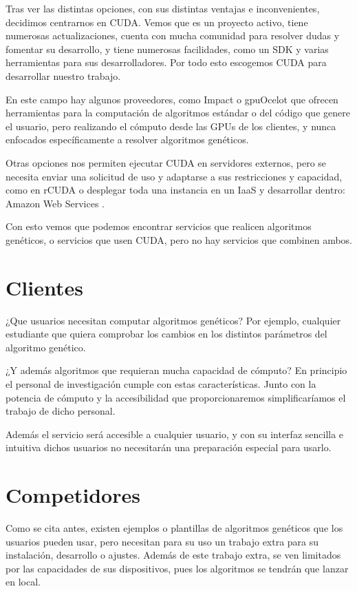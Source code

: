 Tras ver las distintas opciones, con sus distintas ventajas e inconvenientes, decidimos centrarnos en CUDA. Vemos que es un proyecto activo, tiene numerosas actualizaciones, cuenta con mucha comunidad para resolver dudas y fomentar su desarrollo, y tiene numerosas facilidades, como un SDK \cite{nvidiadeveloper} y varias herramientas para sus desarrolladores. Por todo esto escogemos CUDA para desarrollar nuestro trabajo.

En este campo hay algunos proveedores, como Impact  \cite{cudaimpact} o gpuOcelot \cite{cudagpuocelot} que ofrecen herramientas para la computación de algoritmos estándar o del código que genere el usuario, pero  realizando el cómputo desde las GPUs de los clientes, y nunca enfocados específicamente a resolver algoritmos genéticos.

Otras opciones nos permiten ejecutar CUDA en servidores externos, pero se necesita enviar una solicitud de uso y adaptarse a sus restricciones y capacidad, como en rCUDA \cite{rcuda}
o desplegar toda una instancia en un IaaS y desarrollar dentro: Amazon Web Services \cite{amazoncuda}.


Con esto vemos que podemos encontrar servicios que realicen algoritmos genéticos, o servicios que usen CUDA, pero no hay servicios que combinen ambos.


\bigskip
\section{Clientes}
\bigskip

¿Que usuarios necesitan computar algoritmos genéticos?
Por ejemplo, cualquier estudiante que quiera comprobar los cambios en los distintos parámetros del algoritmo genético.

¿Y además algoritmos que requieran mucha capacidad de cómputo? En principio el personal de investigación cumple con estas características. Junto con la potencia de cómputo y la accesibilidad que proporcionaremos simplificaríamos el trabajo de dicho personal. 

Además el servicio será accesible a cualquier usuario, y con su interfaz sencilla e intuitiva dichos usuarios no necesitarán una preparación especial para usarlo. 

\bigskip
\section{Competidores}
\bigskip

Como se cita antes, existen ejemplos o plantillas de algoritmos genéticos \cite{agpython} \cite{agjava} \cite{agmatlab} que los usuarios pueden usar, pero necesitan para su uso un trabajo extra para su instalación, desarrollo o ajustes. Además de este trabajo extra, se ven limitados por las capacidades de sus dispositivos, pues los algoritmos se tendrán que lanzar en local.

